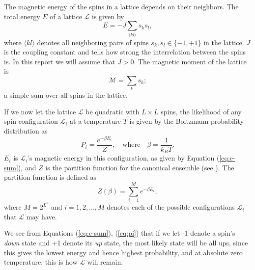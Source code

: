 \documentclass[]{article}
\begin{document}

The magnetic energy of the spins in a lattice depends on their neighbors. The total energy $E$ of a lattice $\mathcal{L}$ is given by
\begin{equation} \label{eq:e-sum}
	E = -J \sum_{\langle kl \rangle} s_k s_l,
\end{equation}
where $\langle kl \rangle$ denotes all neighboring pairs of spins $s_k, s_l \in \{ -1, +1\}$ in the lattice. $J$ is the coupling constant and tells how strong the interrelation between the spins is. In this report we will assume that $J > 0$. The magnetic moment of the lattice is
\begin{equation} \label{eq:m-sum}
	\mathcal{M} = \sum_{k} s_k;
\end{equation}
a simple sum over all spins in the lattice.


If we now let the lattice $\mathcal{L}$ be quadratic with $L \times L$ spins, the likelihood of any spin configuration $\mathcal{L}_i$ at a temperature $T$ is given by the Boltzmann probability distribution as
\begin{equation} \label{eq:pi}
	P_i = \frac{e^{-\beta E_i}}{Z}, \quad \text{where} \quad \beta = \frac{1}{k_BT}.
\end{equation}
$E_i$ is $\mathcal{L}_i$'s magnetic energy in this configuration, as given by Equation (\ref{eq:e-sum}), and $Z$ is the partition function for the canonical ensemble (see \cite{fys4150-notes}). The partition function is defined as
\begin{equation} \label{eq:partition-function}
	Z(\beta) = \sum_{i=1}^{M} e^{-\beta E_i},
\end{equation}
where $M = 2^{L^2}$ and $i = 1,2,...,M$ denotes each of the possible configurations $\mathcal{L}_i$ that $\mathcal{L}$ may have.

We see from Equations (\ref{eq:e-sum}), (\ref{eq:pi}) that if we let -1 denote a spin's \textit{down} state and +1 denote its \textit{up} state, the most likely state will be all ups, since this gives the lowest energy and hence highest probability, and at absolute zero temperature, this is how $\mathcal{L}$ will remain. 
\end{document}
